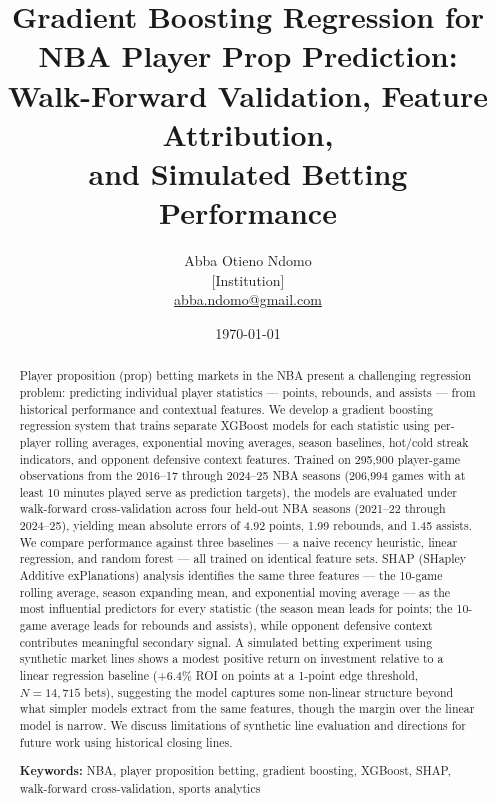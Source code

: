 \documentclass[12pt, letterpaper]{article}
\title{
    \textbf{Gradient Boosting Regression for NBA Player Prop Prediction:}\\
    \large Walk-Forward Validation, Feature Attribution,\\
    and Simulated Betting Performance
}
\author{
    Abba Otieno Ndomo\\
    \small [Institution]\\
    \small \href{mailto:abba.ndomo@gmail.com}{abba.ndomo@gmail.com}
}
\date{\today}
\begin{document}

\maketitle

\begin{abstract}
Player proposition (prop) betting markets in the NBA present a challenging
regression problem: predicting individual player statistics --- points, rebounds,
and assists --- from historical performance and contextual features.
We develop a gradient boosting regression system that trains separate
XGBoost models for each statistic using per-player rolling averages,
exponential moving averages, season baselines, hot/cold streak indicators,
and opponent defensive context features.
Trained on 295,900 player-game observations from the 2016--17 through
2024--25 NBA seasons (206,994 games with at least 10 minutes played serve
as prediction targets), the models are evaluated under walk-forward
cross-validation across four held-out NBA seasons (2021--22 through
2024--25), yielding mean absolute errors of
4.92 points, 1.99 rebounds, and 1.45 assists.
We compare performance against three baselines --- a naive recency heuristic,
linear regression, and random forest --- all trained on identical feature sets.
SHAP (SHapley Additive exPlanations) analysis identifies the same three
features --- the 10-game rolling average, season expanding mean, and
exponential moving average --- as the most influential predictors for every
statistic (the season mean leads for points; the 10-game average leads for
rebounds and assists), while opponent defensive context contributes
meaningful secondary signal.
A simulated betting experiment using synthetic market lines shows a modest
positive return on investment relative to a linear regression baseline
(+6.4\% ROI on points at a 1-point edge threshold, $N=14{,}715$ bets),
suggesting the model captures some non-linear structure beyond what simpler
models extract from the same features, though the margin over the linear
model is narrow.
We discuss limitations of synthetic line evaluation and directions for
future work using historical closing lines.

\medskip
\noindent\textbf{Keywords:} NBA, player proposition betting, gradient boosting,
XGBoost, SHAP, walk-forward cross-validation, sports analytics
\end{abstract}
\end{document}
